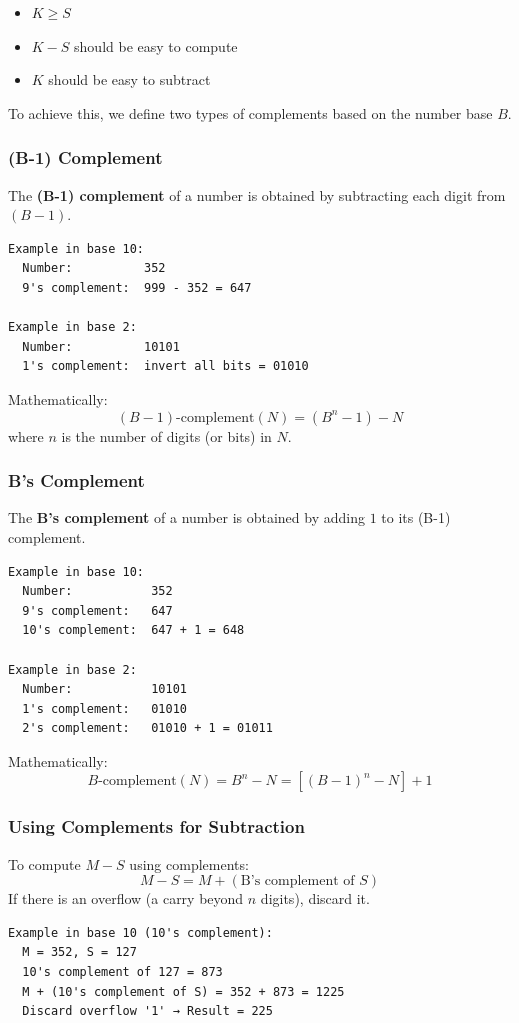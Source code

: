 \documentclass{article}
\begin{document}
\begin{itemize}
  \item $K \geq S$
  \item $K - S$ should be easy to compute
  \item $K$ should be easy to subtract
\end{itemize}

To achieve this, we define two types of complements based on the number base $B$.

\subsubsection{(B-1) Complement}
The \textbf{(B-1) complement} of a number is obtained by subtracting each digit from $(B-1)$.

\begin{verbatim}
Example in base 10:
  Number:          352
  9's complement:  999 - 352 = 647

Example in base 2:
  Number:          10101
  1's complement:  invert all bits = 01010
\end{verbatim}

Mathematically:
\[
(B - 1)\text{-complement}(N) = (B^n - 1) - N
\]
where $n$ is the number of digits (or bits) in $N$.

\subsubsection{B's Complement}
The \textbf{B's complement} of a number is obtained by adding $1$ to its (B-1) complement.

\begin{verbatim}
Example in base 10:
  Number:           352
  9's complement:   647
  10's complement:  647 + 1 = 648

Example in base 2:
  Number:           10101
  1's complement:   01010
  2's complement:   01010 + 1 = 01011
\end{verbatim}

Mathematically:
\[
B\text{-complement}(N) = B^n - N = [(B - 1)^n - N] + 1
\]

\subsubsection{Using Complements for Subtraction}
To compute $M - S$ using complements:
\[
M - S = M + (\text{B's complement of } S)
\]
If there is an overflow (a carry beyond $n$ digits), discard it.

\begin{verbatim}
Example in base 10 (10's complement):
  M = 352, S = 127
  10's complement of 127 = 873
  M + (10's complement of S) = 352 + 873 = 1225
  Discard overflow '1' → Result = 225
\end{verbatim}
\end{document}
